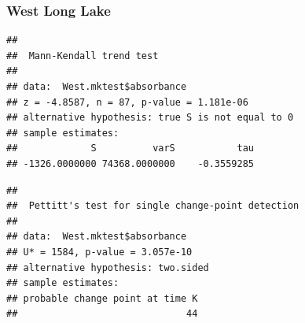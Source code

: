 \documentclass[12pt,]{article}
\newenvironment{Shaded}{\begin{snugshade}}{\end{snugshade}}
\newcommand{\KeywordTok}[1]{\textcolor[rgb]{0.13,0.29,0.53}{\textbf{#1}}}
\newcommand{\DecValTok}[1]{\textcolor[rgb]{0.00,0.00,0.81}{#1}}
\newcommand{\StringTok}[1]{\textcolor[rgb]{0.31,0.60,0.02}{#1}}
\newcommand{\CommentTok}[1]{\textcolor[rgb]{0.56,0.35,0.01}{\textit{#1}}}
\newcommand{\OperatorTok}[1]{\textcolor[rgb]{0.81,0.36,0.00}{\textbf{#1}}}
\newcommand{\NormalTok}[1]{#1}
\begin{document}
\subsubsection{West Long Lake}\label{west-long-lake}

\begin{Shaded}
\end{Shaded}

\begin{verbatim}
## 
##  Mann-Kendall trend test
## 
## data:  West.mktest$absorbance
## z = -4.8587, n = 87, p-value = 1.181e-06
## alternative hypothesis: true S is not equal to 0
## sample estimates:
##             S          varS           tau 
## -1326.0000000 74368.0000000    -0.3559285
\end{verbatim}

\begin{Shaded}
\end{Shaded}

\begin{verbatim}
## 
##  Pettitt's test for single change-point detection
## 
## data:  West.mktest$absorbance
## U* = 1584, p-value = 3.057e-10
## alternative hypothesis: two.sided
## sample estimates:
## probable change point at time K 
##                              44
\end{verbatim}

\begin{Shaded}
\end{Shaded}
\end{document}
